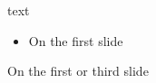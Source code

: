 \documentclass{beamer}
\begin{document}
\begin{frame}
text
\pause
\begin{itemize}[<.->]
\item On the first slide
\end{itemize}
\pause
On the first or third slide
\end{frame}
\end{document}
